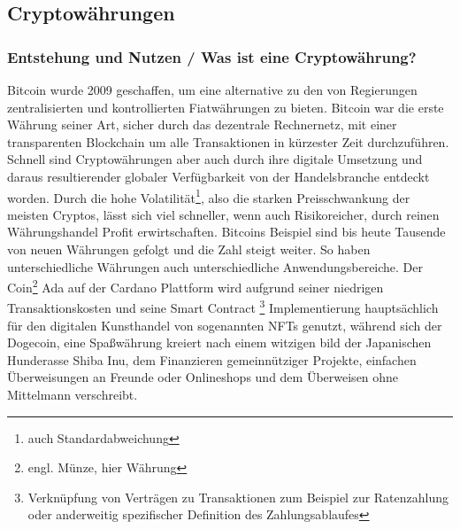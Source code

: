 \documentclass[12pt]{article}
\begin{document}
\subsection{Cryptowährungen}
	\subsubsection{Entstehung und Nutzen / Was ist eine Cryptowährung?}
		Bitcoin wurde 2009 geschaffen, um eine alternative zu den von Regierungen zentralisierten und kontrollierten Fiatwährungen zu bieten. Bitcoin war die erste Währung seiner Art, sicher durch das dezentrale Rechnernetz, mit einer transparenten Blockchain um alle Transaktionen in kürzester Zeit durchzuführen. Schnell sind Cryptowährungen aber auch durch ihre digitale Umsetzung und daraus resultierender globaler Verfügbarkeit von der Handelsbranche entdeckt worden. Durch die hohe Volatilität\footnote{auch Standardabweichung}, also die starken Preisschwankung der meisten Cryptos, lässt sich viel schneller, wenn auch Risikoreicher, durch reinen Währungshandel Profit erwirtschaften. Bitcoins Beispiel sind bis heute Tausende von neuen Währungen gefolgt und die Zahl steigt weiter. So haben unterschiedliche Währungen auch unterschiedliche Anwendungsbereiche. Der Coin\footnote{engl. Münze, hier Währung} Ada auf der Cardano Plattform wird aufgrund seiner niedrigen Transaktionskosten und seine Smart Contract \footnote{Verknüpfung von Verträgen zu Transaktionen zum Beispiel zur Ratenzahlung oder anderweitig spezifischer Definition des Zahlungsablaufes} Implementierung hauptsächlich für den digitalen Kunsthandel von sogenannten NFTs genutzt, während sich der Dogecoin, eine Spaßwährung kreiert nach einem witzigen bild der Japanischen Hunderasse Shiba Inu, dem Finanzieren gemeinnütziger Projekte, einfachen Überweisungen an Freunde oder Onlineshops und dem Überweisen ohne Mittelmann verschreibt.
		
\end{document}
